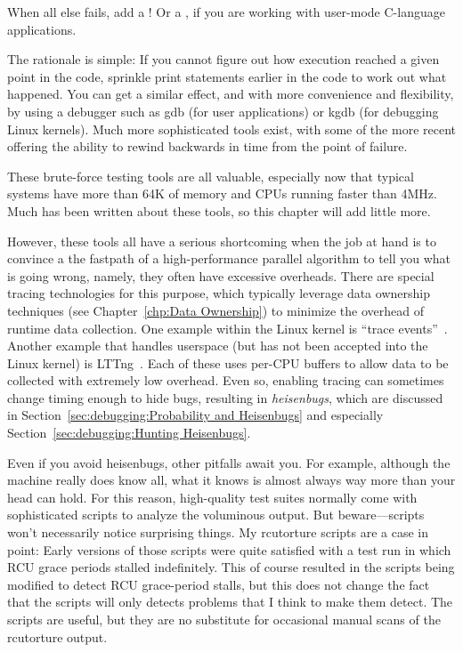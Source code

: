 When all else fails, add a !
Or a , if you are working with user-mode C-language applications.

The rationale is simple: If you cannot figure out how execution reached
a given point in the code, sprinkle print statements earlier in the
code to work out what happened.
You can get a similar effect, and with more convenience and flexibility,
by using a debugger such as gdb (for user applications) or kgdb
(for debugging Linux kernels).
Much more sophisticated tools exist, with some of the more recent
offering the ability to rewind backwards in time from the point
of failure.

These brute-force testing tools are all valuable, especially now
that typical systems have more than 64K of memory and CPUs running
faster than 4MHz.
Much has been
written about these tools, so this chapter will add little more.

However, these tools all have a serious shortcoming when the job at hand
is to convince a the fastpath of a high-performance parallel algorithm
to tell you what is going wrong, namely, they often have excessive
overheads.
There are special tracing technologies for this purpose, which typically
leverage data ownership techniques
(see Chapter~\ref{chp:Data Ownership})
to minimize the overhead of runtime data collection.
One example within the Linux kernel is
``trace events''~\cite{StevenRostedt2010perfTraceEventP1,StevenRostedt2010perfTraceEventP2,StevenRostedt2010perfTraceEventP3,StevenRostedt2010perfHP+DeathlyMacros}.
Another example that handles userspace (but has not been accepted into
the Linux kernel) is LTTng~\cite{MathieuDesnoyers2009LFCollabSummit}.
Each of these uses per-CPU buffers to allow data to be collected with
extremely low overhead.
Even so, enabling tracing can sometimes change timing enough to
hide bugs, resulting in \emph{heisenbugs}, which are discussed in
Section~\ref{sec:debugging:Probability and Heisenbugs}
and especially Section~\ref{sec:debugging:Hunting Heisenbugs}.

Even if you avoid heisenbugs, other pitfalls await you.
For example, although the machine really does know all,
what it knows is almost always way more than your head can hold.
For this reason, high-quality test suites normally come with sophisticated
scripts to analyze the voluminous output.
But beware---scripts won't necessarily notice surprising things.
My rcutorture scripts are a case in point: Early versions of those
scripts were quite satisfied with a test run in which RCU grace periods
stalled indefinitely.
This of course resulted in the scripts being modified to detect RCU
grace-period stalls, but this does not change the fact that the scripts
will only detects problems that I think to make them detect.
The scripts are useful, but they are no substitute for occasional
manual scans of the rcutorture output.

